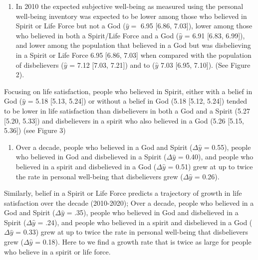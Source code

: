 \documentclass[
  english,
  man,floatsintext]{apa6}
\providecommand{\tightlist}{%
  \setlength{\itemsep}{0pt}\setlength{\parskip}{0pt}}
\begin{document}
\begin{enumerate}
\def\labelenumi{\arabic{enumi}.}
\tightlist
\item
  In 2010 the expected subjective well-being as measured using the personal well-being inventory was expected to be lower among those who believed in Spirit or Life Force but not a God (\(\hat{y} =\) 6.95 \textbar{} {[}6.86, 7.03{]}), lower among those who believed in both a Spirit/Life Force and a God (\(\hat{y}\) = 6.91 \textbar{} {[}6.83, 6.99{]}), and lower among the population that believed in a God but was disbelieving in a Spirit or Life Force 6.95 \textbar{} {[}6.86, 7.03{]} when compared with the population of disbelievers (\(\hat{y}\) = 7.12 \textbar{} {[}7.03, 7.21{]}) and to (\(\hat{y}\) 7.03 \textbar{} {[}6.95, 7.10{]}). (See Figure 2).
\end{enumerate}

Focusing on life satisfaction, people who believed in Spirit, either with a belief in God (\(\hat{y}\) = 5.18 \textbar{} {[}5.13, 5.24{]}) or without a belief in God (5.18 \textbar{} {[}5.12, 5.24{]}) tended to be lower in life satisfaction than disbelievers in both a God and a Spirit (5.27 \textbar{} {[}5.20, 5.33{]}) and disbelievers in a spirit who also believed in a God (5.26 \textbar{} {[}5.15, 5.36{]}) (see Figure 3)

\begin{enumerate}
\def\labelenumi{\arabic{enumi}.}
\setcounter{enumi}{1}
\tightlist
\item
  Over a decade, people who believed in a God and Spirit (\(\Delta \hat{y}\) = 0.55), people who believed in God and disbelieved in a Spirit (\(\Delta \hat{y}\) = 0.40), and people who believed in a spirit and disbelieved in a God (\(\Delta \hat{y}\) = 0.51) grew at up to twice the rate in personal well-being that disbelievers grew (\(\Delta \hat{y}\) = 0.26).
\end{enumerate}

Similarly, belief in a Spirit or Life Force predicts a trajectory of growth in life satisfaction over the decade (2010-2020);
Over a decade, people who believed in a God and Spirit (\(\Delta \hat{y}\) = .35), people who believed in God and disbelieved in a Spirit (\(\Delta \hat{y}\) = .24), and people who believed in a spirit and disbelieved in a God (\(\Delta \hat{y}\) = 0.33) grew at up to twice the rate in personal well-being that disbelievers grew (\(\Delta \hat{y}\) = 0.18). Here to we find a growth rate that is twice as large for people who believe in a spirit or life force.
\end{document}
